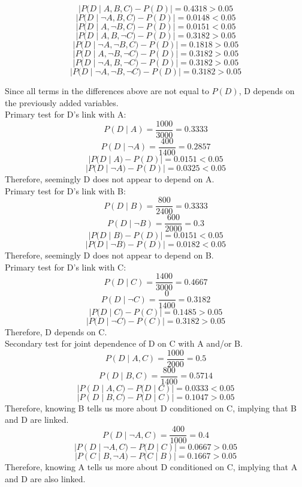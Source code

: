 \documentclass[english]{article}
\begin{document}
\begin{enumerate}
    $$|P(D \;|\; A,B,C) - P(D)| = 0.4318 > 0.05$$
    $$|P(D \;|\; \neg A,B,C) - P(D)| = 0.0148 < 0.05$$
    $$|P(D \;|\; A,\neg B,C) - P(D)| = 0.0151 < 0.05$$
    $$|P(D \;|\; A,B,\neg C) - P(D)| = 0.3182 > 0.05$$
    $$|P(D \;|\; \neg A,\neg B,C) - P(D)| = 0.1818 > 0.05$$
    $$|P(D \;|\; A,\neg B,\neg C) - P(D)| = 0.3182 > 0.05$$
    $$|P(D \;|\; \neg A,B,\neg C) - P(D)| = 0.3182 > 0.05$$
    $$|P(D \;|\; \neg A,\neg B,\neg C) - P(D)| = 0.3182 > 0.05$$
    
    Since all terms in the differences above are not equal to $P(D)$, D depends on the previously added variables. \\
    Primary test for D's link with A:
    $$P(D \;|\; A) = \frac{1000}{3000} = 0.3333$$
    $$P(D \;|\; \neg A) = \frac{400}{1400} = 0.2857$$
    $$|P(D \;|\; A) - P(D)| = 0.0151 < 0.05$$
    $$|P(D \;|\; \neg A) - P(D)| = 0.0325 < 0.05$$
    Therefore, seemingly D does not appear to depend on A. \\
    
    Primary test for D's link with B:
    $$P(D \;|\; B) = \frac{800}{2400} = 0.3333$$
    $$P(D \;|\; \neg B) = \frac{600}{2000} = 0.3$$
    $$|P(D \;|\; B) - P(D)| = 0.0151 < 0.05$$
    $$|P(D \;|\; \neg B) - P(D)| = 0.0182 < 0.05$$
    Therefore, seemingly D does not appear to depend on B. \\
    
    Primary test for D's link with C:
    $$P(D \;|\; C) = \frac{1400}{3000} = 0.4667$$
    $$P(D \;|\; \neg C) = \frac{0}{1400} = 0.3182$$
    $$|P(D \;|\; C) - P(C)| = 0.1485 > 0.05$$
    $$|P(D \;|\; \neg C) - P(C)| = 0.3182 > 0.05$$
    Therefore, D depends on C. \\
    
    Secondary test for joint dependence of D on C with A and/or B.
    $$P(D \;|\; A, C) = \frac{1000}{2000} = 0.5$$
    $$P(D \;|\; B, C) = \frac{800}{1400} = 0.5714$$
    $$|P(D \;|\; A, C) - P(D \;|\; C)| =  0.0333 < 0.05$$
    $$|P(D \;|\; B, C) - P(D \;|\; C)| =  0.1047 > 0.05$$
    Therefore, knowing B tells us more about D conditioned on C, implying that B and D are linked.
    $$P(D \;|\; \neg A, C) = \frac{400}{1000} = 0.4$$
    $$|P(D \;|\; \neg A, C) - P(D \;|\; C)| =  0.0667 > 0.05$$
    $$|P(C \;|\; B, \neg A) - P(C \;|\; B)| = 0.1667 > 0.05$$
    Therefore, knowing A tells us more about D conditioned on C, implying that A and D are also linked.
    

\end{enumerate}
\end{document}
